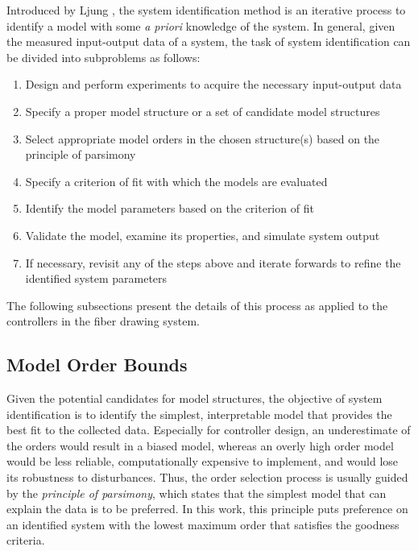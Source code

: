 Introduced by Ljung \cite{ljung1999system}, the system identification method is an iterative process to identify a model with some \emph{a priori} knowledge of the system. In general, given the measured input-output data of a system, the task of system identification can be divided into subproblems as follows: 

\begin{enumerate}
    \item Design and perform experiments to acquire the necessary input-output data 
    \item Specify a proper model structure or a set of candidate model structures 
    \item Select appropriate model orders in the chosen structure(s) based on the principle of parsimony 
    \item Specify a criterion of fit with which the models are evaluated
    \item Identify the model parameters based on the criterion of fit
    \item Validate the model, examine its properties, and simulate system output
    \item If necessary, revisit any of the steps above and iterate forwards to refine the identified system parameters
\end{enumerate}

The following subsections present the details of this process as applied to the controllers in the fiber drawing system. 

\subsection{Model Order Bounds} \label{ch:sysid:proc:order}

Given the potential candidates for model structures, the objective of system identification is to identify the simplest, interpretable model that provides the best fit to the collected data. Especially for controller design, an underestimate of the orders would result in a biased model, whereas an overly high order model would be less reliable, computationally expensive to implement, and would lose its robustness to disturbances. Thus, the order selection process is usually guided by the \emph{principle of parsimony}, which states that the simplest model that can explain the data is to be preferred. In this work, this principle puts preference on an identified system with the lowest maximum order that satisfies the goodness criteria. 

